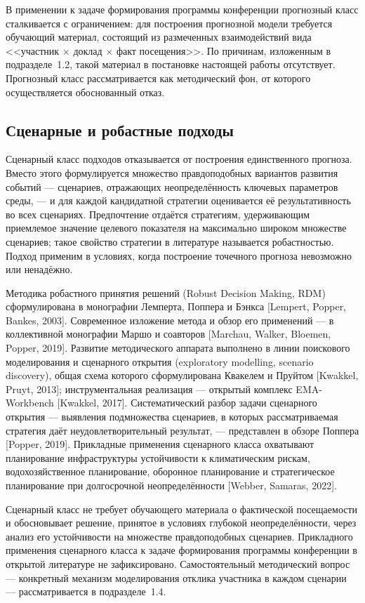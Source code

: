 В применении к задаче формирования программы конференции прогнозный класс сталкивается с ограничением: для построения прогнозной модели требуется обучающий материал, состоящий из размеченных взаимодействий вида <<участник $\times$ доклад $\times$ факт посещения>>. По причинам, изложенным в подразделе~1.2, такой материал в постановке настоящей работы отсутствует. Прогнозный класс рассматривается как методический фон, от которого осуществляется обоснованный отказ.


\subsection{Сценарные и робастные подходы}

Сценарный класс подходов отказывается от построения единственного прогноза. Вместо этого формулируется множество правдоподобных вариантов развития событий --- сценариев, отражающих неопределённость ключевых параметров среды, --- и для каждой кандидатной стратегии оценивается её результативность во всех сценариях. Предпочтение отдаётся стратегиям, удерживающим приемлемое значение целевого показателя на максимально широком множестве сценариев; такое свойство стратегии в литературе называется робастностью. Подход применим в условиях, когда построение точечного прогноза невозможно или ненадёжно.

Методика робастного принятия решений (Robust Decision Making, RDM) сформулирована в монографии Лемперта, Поппера и Бэнкса [Lempert, Popper, Bankes, 2003]. Современное изложение метода и обзор его применений --- в коллективной монографии Маршо и соавторов [Marchau, Walker, Bloemen, Popper, 2019]. Развитие методического аппарата выполнено в линии поискового моделирования и сценарного открытия (exploratory modelling, scenario discovery), общая схема которого сформулирована Квакелем и Пруйтом [Kwakkel, Pruyt, 2013]; инструментальная реализация --- открытый комплекс EMA-Workbench [Kwakkel, 2017]. Систематический разбор задачи сценарного открытия --- выявления подмножества сценариев, в которых рассматриваемая стратегия даёт неудовлетворительный результат, --- представлен в обзоре Поппера [Popper, 2019]. Прикладные применения сценарного класса охватывают планирование инфраструктуры устойчивости к климатическим рискам, водохозяйственное планирование, оборонное планирование и стратегическое планирование при долгосрочной неопределённости [Webber, Samaras, 2022].

Сценарный класс не требует обучающего материала о фактической посещаемости и обосновывает решение, принятое в условиях глубокой неопределённости, через анализ его устойчивости на множестве правдоподобных сценариев. Прикладного применения сценарного класса к задаче формирования программы конференции в открытой литературе не зафиксировано. Самостоятельный методический вопрос --- конкретный механизм моделирования отклика участника в каждом сценарии --- рассматривается в подразделе~1.4.


